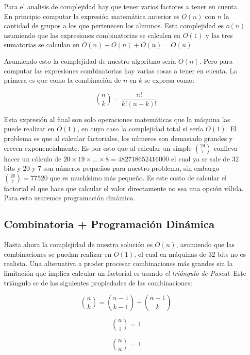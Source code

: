 \documentclass{article}
\begin{document}
Para el analisis de complejidad hay que tener varios factores a tener en cuenta. En principio computar la expresión matemática anterior es $O(n)$ con $n$ la cantidad de grupos a los que pertenecen los alumnos. Esta complejidad es $o(n)$ asumiendo que las expresiones combinatorias se calculen en $O(1)$ y las tres sumatorias se calculan en $O(n) + O(n) + O(n) = O(n)$.

Asumiendo esto la complejidad de nuestro algoritmo sería $O(n)$. Pero para computar las expresiones combinatorias hay varias cosas a tener en cuenta. La primera es que como la combinación de $n$ en $k$ se expresa como:

$$
    {n \choose k} = \frac{n!}{k!(n - k)!}
$$

Esta expresión al final son solo operaciones matemáticas que la máquina las puede realizar en $O(1)$, en cuyo caso la complejidad total sí sería $O(1)$. El problema es que al calcular factoriales, los números son demasiado grandes y crecen exponencialmente. Es por esto que al calcular un simple $20 \choose 7$ conlleva hacer un cálculo de $20 \times 19 \times \dots \times 8 = 482718652416000$ el cual ya se sale de 32 bits y $20$ y $7$ son números pequeños para nuestro problema, sin embargo ${20 \choose 7} = 77520$ que es muchísimo más pequeño. Es este costo de calcular el factorial el que hace que calcular el valor directamente no sea una opción válida. Para esto usaremos programación dinámica.


\subsection{Combinatoria + Programación Dinámica}

Hasta ahora la complejidad de nuestra solución es $O(n)$, asumiendo que las combinaciones se puedan realizar en $O(1)$, el cual en máquinas de 32 bits no es realista. Una alternativa a proder procesar combinaciones más grandes sin la limitación que implica calcular un factorial es usando \textit{el triángulo de Pascal}. Este triángulo se de las siguientes propiedades de las combinaciones:

$${n \choose k} = {n - 1 \choose k - 1} + {n - 1 \choose k}$$

$${n \choose 1} = 1$$

$${n \choose n} = 1$$

\end{document}
